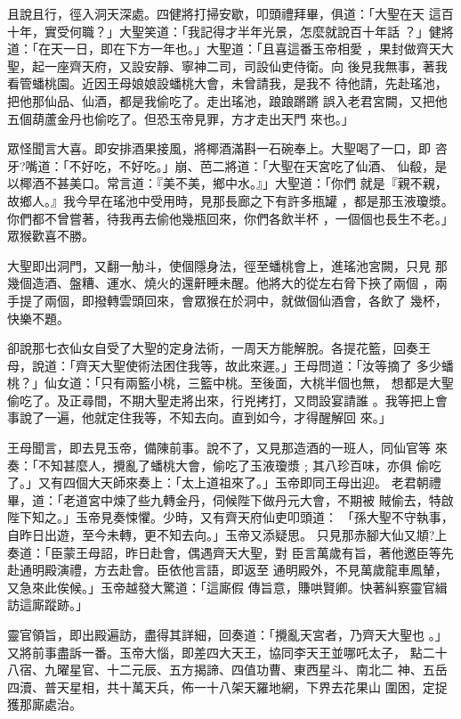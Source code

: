 \begin{pinyinscope}
{且說且行，徑入洞天深處。四健將打掃安歇，叩頭禮拜畢，俱道：「大聖在天
這百十年，實受何職？」大聖笑道：「我記得才半年光景，怎麼就說百十年話
？」健將道：「在天一日，即在下方一年也。」大聖道：「且喜這番玉帝相愛
，果封做齊天大聖，起一座齊天府，又設安靜、寧神二司，司設仙吏侍衛。向
後見我無事，著我看管蟠桃園。近因王母娘娘設蟠桃大會，未曾請我，是我不
待他請，先赴瑤池，把他那仙品、仙酒，都是我偷吃了。走出瑤池，踉踉蹡蹡
誤入老君宮闕，又把他五個葫蘆金丹也偷吃了。但恐玉帝見罪，方才走出天門
來也。」

眾怪聞言大喜。即安排酒果接風，將椰酒滿斟一石碗奉上。大聖喝了一口，即
咨牙?嘴道：「不好吃，不好吃。」崩、芭二將道：「大聖在天宮吃了仙酒、
仙殽，是以椰酒不甚美口。常言道：『美不美，鄉中水。』」大聖道：「你們
就是『親不親，故鄉人。』我今早在瑤池中受用時，見那長廊之下有許多瓶罐
，都是那玉液瓊漿。你們都不曾嘗著，待我再去偷他幾瓶回來，你們各飲半杯
，一個個也長生不老。」眾猴歡喜不勝。

大聖即出洞門，又翻一觔斗，使個隱身法，徑至蟠桃會上，進瑤池宮闕，只見
那幾個造酒、盤糟、運水、燒火的還鼾睡未醒。他將大的從左右脅下挾了兩個
，兩手提了兩個，即撥轉雲頭回來，會眾猴在於洞中，就做個仙酒會，各飲了
幾杯，快樂不題。

卻說那七衣仙女自受了大聖的定身法術，一周天方能解脫。各提花籃，回奏王
母，說道：「齊天大聖使術法困住我等，故此來遲。」王母問道：「汝等摘了
多少蟠桃？」仙女道：「只有兩籃小桃，三籃中桃。至後面，大桃半個也無，
想都是大聖偷吃了。及正尋間，不期大聖走將出來，行兇拷打，又問設宴請誰
。我等把上會事說了一遍，他就定住我等，不知去向。直到如今，才得醒解回
來。」

王母聞言，即去見玉帝，備陳前事。說不了，又見那造酒的一班人，同仙官等
來奏：「不知甚麼人，攪亂了蟠桃大會，偷吃了玉液瓊漿﹔其八珍百味，亦俱
偷吃了。」又有四個大天師來奏上：「太上道祖來了。」玉帝即同王母出迎。
老君朝禮畢，道：「老道宮中煉了些九轉金丹，伺候陛下做丹元大會，不期被
賊偷去，特啟陛下知之。」玉帝見奏悚懼。少時，又有齊天府仙吏叩頭道：
「孫大聖不守執事，自昨日出遊，至今未轉，更不知去向。」玉帝又添疑思。
只見那赤腳大仙又頫?上奏道：「臣蒙王母詔，昨日赴會，偶遇齊天大聖，對
臣言萬歲有旨，著他邀臣等先赴通明殿演禮，方去赴會。臣依他言語，即返至
通明殿外，不見萬歲龍車鳳輦，又急來此俟候。」玉帝越發大驚道：「這廝假
傳旨意，賺哄賢卿。快著糾察靈官緝訪這廝蹤跡。」

靈官領旨，即出殿遍訪，盡得其詳細，回奏道：「攪亂天宮者，乃齊天大聖也
。」又將前事盡訴一番。玉帝大惱，即差四大天王，協同李天王並哪吒太子，
點二十八宿、九曜星官、十二元辰、五方揭諦、四值功曹、東西星斗、南北二
神、五岳四瀆、普天星相，共十萬天兵，佈一十八架天羅地網，下界去花果山
圍困，定捉獲那廝處治。

}
\end{pinyinscope}
